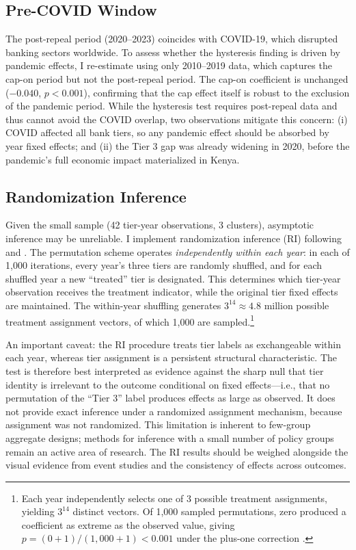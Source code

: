 \documentclass[12pt]{article}
\begin{document}
\subsection{Pre-COVID Window}

The post-repeal period (2020--2023) coincides with COVID-19, which disrupted banking sectors worldwide. To assess whether the hysteresis finding is driven by pandemic effects, I re-estimate  using only 2010--2019 data, which captures the cap-on period but not the post-repeal period. The cap-on coefficient is unchanged ($-0.040$, $p < 0.001$), confirming that the cap effect itself is robust to the exclusion of the pandemic period. While the hysteresis test requires post-repeal data and thus cannot avoid the COVID overlap, two observations mitigate this concern: (i) COVID affected all bank tiers, so any pandemic effect should be absorbed by year fixed effects; and (ii) the Tier 3 gap was already widening in 2020, before the pandemic's full economic impact materialized in Kenya.

\subsection{Randomization Inference}

Given the small sample (42 tier-year observations, 3 clusters), asymptotic inference may be unreliable. I implement randomization inference (RI) following \citet{fisher1935design} and \citet{young2019channeling}. The permutation scheme operates \textit{independently within each year}: in each of 1,000 iterations, every year's three tiers are randomly shuffled, and for each shuffled year a new ``treated'' tier is designated. This determines which tier-year observation receives the treatment indicator, while the original tier fixed effects are maintained. The within-year shuffling generates $3^{14} \approx 4.8$ million possible treatment assignment vectors, of which 1,000 are sampled.\footnote{Each year independently selects one of 3 possible treatment assignments, yielding $3^{14}$ distinct vectors. Of 1,000 sampled permutations, zero produced a coefficient as extreme as the observed value, giving $p = (0 + 1)/(1{,}000 + 1) < 0.001$ under the plus-one correction \citep{phipson2010permutation}.}

An important caveat: the RI procedure treats tier labels as exchangeable within each year, whereas tier assignment is a persistent structural characteristic. The test is therefore best interpreted as evidence against the sharp null that tier identity is irrelevant to the outcome conditional on fixed effects---i.e., that no permutation of the ``Tier 3'' label produces effects as large as observed. It does not provide exact inference under a randomized assignment mechanism, because assignment was not randomized. This limitation is inherent to few-group aggregate designs; methods for inference with a small number of policy groups \citep[e.g.,][]{cameron2008bootstrap} remain an active area of research. The RI results should be weighed alongside the visual evidence from event studies and the consistency of effects across outcomes.
\end{document}
